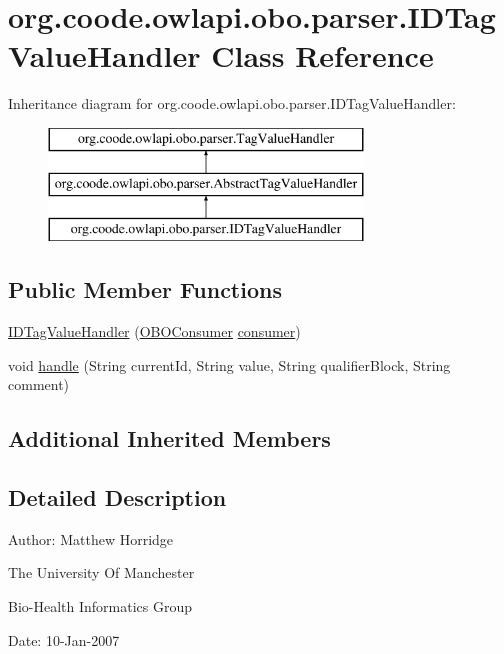 \hypertarget{classorg_1_1coode_1_1owlapi_1_1obo_1_1parser_1_1_i_d_tag_value_handler}{\section{org.\-coode.\-owlapi.\-obo.\-parser.\-I\-D\-Tag\-Value\-Handler Class Reference}
\label{classorg_1_1coode_1_1owlapi_1_1obo_1_1parser_1_1_i_d_tag_value_handler}
}
Inheritance diagram for org.\-coode.\-owlapi.\-obo.\-parser.\-I\-D\-Tag\-Value\-Handler\-:\begin{figure}[H]
\begin{center}
\leavevmode
\includegraphics[height=3.000000cm]{classorg_1_1coode_1_1owlapi_1_1obo_1_1parser_1_1_i_d_tag_value_handler}
\end{center}
\end{figure}
\subsection*{Public Member Functions}
\begin{DoxyCompactItemize}
\item 
\hyperlink{classorg_1_1coode_1_1owlapi_1_1obo_1_1parser_1_1_i_d_tag_value_handler_a90e64263254c2fbdcc5e0b078517ea7d}{I\-D\-Tag\-Value\-Handler} (\hyperlink{classorg_1_1coode_1_1owlapi_1_1obo_1_1parser_1_1_o_b_o_consumer}{O\-B\-O\-Consumer} \hyperlink{classorg_1_1coode_1_1owlapi_1_1obo_1_1parser_1_1_abstract_tag_value_handler_ab27f1ff22d15640c5f81585f18265137}{consumer})
\item 
void \hyperlink{classorg_1_1coode_1_1owlapi_1_1obo_1_1parser_1_1_i_d_tag_value_handler_ae37f8af373b1ab11738e9858086868ca}{handle} (String current\-Id, String value, String qualifier\-Block, String comment)
\end{DoxyCompactItemize}
\subsection*{Additional Inherited Members}


\subsection{Detailed Description}
Author\-: Matthew Horridge\par
 The University Of Manchester\par
 Bio-\/\-Health Informatics Group\par
 Date\-: 10-\/\-Jan-\/2007\par
\par
 

